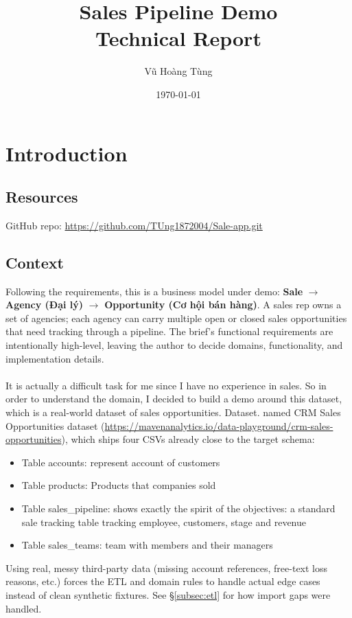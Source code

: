 \documentclass[13pt, a4paper]{article}
\title{Sales Pipeline Demo \\ \large Technical Report}
\author{Vũ Hoàng Tùng}
\date{\today}
\begin{document}
\maketitle
\tableofcontents
\newpage

\section{Introduction}
\subsection{Resources}
GitHub repo: \url{https://github.com/TUng1872004/Sale-app.git}\\
\subsection{Context}
Following the requirements, this is a business model under demo: \textbf{Sale} $\rightarrow$ \textbf{Agency (Đại lý)} $\rightarrow$
\textbf{Opportunity (Cơ hội bán hàng)}. A sales rep owns a set of agencies; each agency can carry
multiple open or closed sales opportunities that need tracking through a pipeline. The brief's functional requirements 
are intentionally high-level, leaving the author to decide domains, 
functionality, and implementation details. 
\\\\
It is actually a difficult task for me since I have no experience in sales. So in order to understand the domain, I decided to 
build a demo around this dataset, which is a real-world dataset of sales opportunities. {Dataset.} named 
CRM Sales Opportunities dataset (\url{https://mavenanalytics.io/data-playground/crm-sales-opportunities}), which ships four
CSVs already close to the target schema: 
\begin{itemize}
    \item Table accounts: represent account of customers
    \item Table products: Products that companies sold
    \item Table sales\_pipeline: shows exactly the spirit of the objectives: a standard sale tracking table tracking employee, customers, stage and revenue
    \item Table sales\_teams: team with members and their managers
\end{itemize}
Using real, messy third-party data (missing
account references, free-text loss reasons, etc.) forces the ETL and domain rules to handle
actual edge cases instead of clean synthetic fixtures. See \S\ref{subsec:etl} for how import
gaps were handled.
\end{document}
